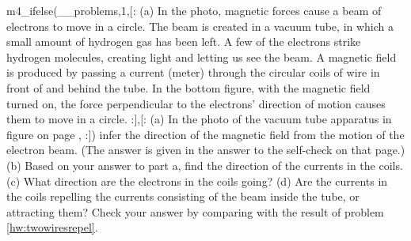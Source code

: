 m4_ifelse(__problems,1,[:%
        (a) In the photo,
              magnetic forces cause a beam of electrons to move in a circle.
              The beam is created in a vacuum tube, in which a small amount of
              hydrogen gas has been left. A few of the electrons strike hydrogen
              molecules, creating light and letting us see the beam. A magnetic
              field is produced by passing a current (meter) through the circular
              coils of wire in front of and behind the tube. In the bottom figure,
              with the magnetic field turned on, the force perpendicular to the
              electrons' direction of motion causes them to move in a circle.
:],[:%
        (a) In the photo of the vacuum tube apparatus in figure 
        on page \pageref{fig:circular-orbit},
:])%
        infer the direction of the magnetic field from
        the motion of the electron beam. (The answer is given in the answer to the self-check
        on that page.)\hwendpart
        (b) Based on your answer to part
        a, find the direction of the currents in the coils.\hwendpart
        (c) What
        direction are the electrons in the coils going? \hwendpart
        (d) Are the
        currents in the coils repelling the currents
        consisting of the beam inside the tube, or attracting them? Check your answer by comparing with
        the result of problem \ref{hw:twowiresrepel}.
